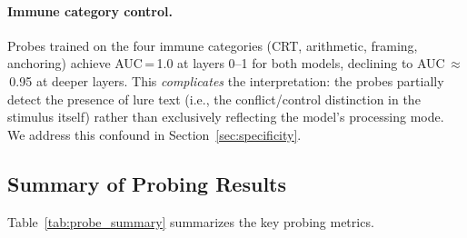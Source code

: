 \documentclass[twocolumn,10pt]{article}
\begin{document}
\paragraph{Immune category control.}  Probes trained on the four immune
categories (CRT, arithmetic, framing, anchoring) achieve
AUC\,=\,1.0 at layers 0--1 for both models, declining to
AUC\,$\approx$\,0.95 at deeper layers.  This \emph{complicates} the
interpretation: the probes partially detect the presence of lure text
(i.e., the conflict/control distinction in the stimulus itself) rather
than exclusively reflecting the model's processing mode.  We address
this confound in Section~\ref{sec:specificity}.

\subsection{Summary of Probing Results}

Table~\ref{tab:probe_summary} summarizes the key probing metrics.

\begin{table}[t]
\centering
\caption{Probing summary at peak layer for the three
  vulnerable categories.  95\% CIs from 1000 bootstrap resamples
  (Llama and R1-Distill).
  Selectivity = true AUC $-$ control AUC.
  Qwen think and no-think produce identical probe results despite
  a 3$\times$ behavioral difference.  OLMo replicates the same
  direction: Instruct $>$ Think.}
\label{tab:probe_summary}
\vspace{4pt}
\scriptsize
{}%
\end{table}
\end{document}
